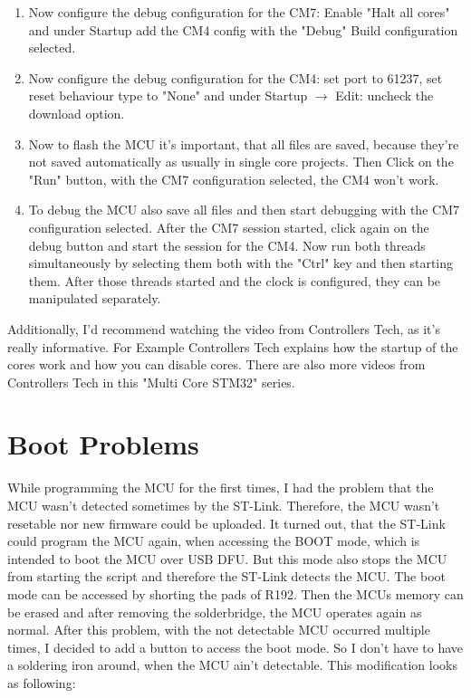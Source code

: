 \begin{enumerate}
\begin{codeblock}
		\end{codeblock}
	\item Now configure the debug configuration for the CM7: Enable "Halt all cores" and under Startup add the CM4 config with the "Debug" Build configuration selected.
	\item Now configure the debug configuration for the CM4: set port to 61237, set reset behaviour type to "None" and under Startup \(\rightarrow\) Edit: uncheck the download option.
	\item Now to flash the MCU it's important, that all files are saved, because they're not saved automatically as usually in single core projects. Then Click on the "Run" button, with the CM7 configuration selected, the CM4 won't work.
	\item To debug the MCU also save all files and then start debugging with the CM7 configuration selected. After the CM7 session started, click again on the debug button and start the session for the CM4. Now run both threads simultaneously by selecting them both with the "Ctrl" key and then starting them. After those threads started and the clock is configured, they can be manipulated separately.
\end{enumerate} 

Additionally, I'd recommend watching the video from Controllers Tech, as it's really informative. \cite{YT_CT_Mutlicore_Debugging} For Example Controllers Tech explains how the startup of the cores work and how you can disable cores. There are also more videos from Controllers Tech in this "Multi Core STM32" series.



\section{Boot Problems}
While programming the MCU for the first times, I had the problem that the MCU wasn't detected sometimes by the ST-Link. Therefore, the MCU wasn't resetable nor new firmware could be uploaded. It turned out, that the ST-Link could program the MCU again, when accessing the BOOT mode, which is intended to boot the MCU over USB DFU. But this mode also stops the MCU from starting the script and therefore the ST-Link detects the MCU. The boot mode can be accessed by shorting the pads of R192. Then the MCUs memory can be erased and after removing the solderbridge, the MCU operates again as normal. After this problem, with the not detectable MCU occurred multiple times, I decided to add a button to access the boot mode. So I don't have to have a soldering iron around, when the MCU ain't detectable. This modification looks as following:

